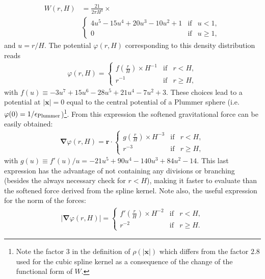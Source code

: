 \begin{align}
W(r,H) &= \frac{21}{2\pi H^3} \times \nonumber \\
&\left\lbrace\begin{array}{rcl}
4u^5 - 15u^4 + 20u^3 - 10u^2 + 1 & \mbox{if} & u < 1,\\
0 & \mbox{if} & u \geq 1,
\end{array}
\right.
\end{align}
and $u = r/H$. The potential $\varphi(r,H)$ corresponding to this density distribution reads
\begin{align}
\varphi(r,H) = 
\left\lbrace\begin{array}{rcl}
f(\frac{r}{H}) \times H^{-1} & \mbox{if} & r < H,\\
r^{-1} & \mbox{if} & r \geq H,
\end{array}
\right.
\label{eq:fmm:potential}
\end{align}
with $f(u) \equiv -3u^7 + 15u^6 - 28u^5 + 21u^4 - 7u^2 + 3$. These
choices lead to a potential at $|\mathbf{x}| = 0$ equal to the central
potential of a Plummer sphere (i.e. $\varphi(0) = 1/\epsilon_{\rm
  Plummer}$)\footnote{Note the factor $3$ in the definition of
  $\rho(|\mathbf{x}|)$ which differs from the factor $2.8$ used for
  the cubic spline kernel as a consequence of the change of the functional
  form of $W$.}. From this expression the softened gravitational force can
be easily obtained:
\begin{align}
\mathbf{\nabla}\varphi(r,H) = \mathbf{r} \cdot
\left\lbrace\begin{array}{rcl}
g(\frac{r}{H}) \times H^{-3} & \mbox{if} & r < H,\\
r^{-3} & \mbox{if} & r \geq H,
\end{array}
\right.
\label{eq:fmm:force}
\end{align}
with $g(u) \equiv f'(u)/u = -21u^5+90u^4-140u^3+84u^2-14$. This last
expression has the advantage of not containing any divisions or
branching (besides the always necessary check for $r<H$), making it
faster to evaluate than the softened force derived from the
\cite{Monaghan1985} spline kernel. Note also, the useful expression
for the norm of the forces:
\begin{align}
|\mathbf{\nabla}\varphi(r,H)| = 
\left\lbrace\begin{array}{rcl}
f'(\frac{r}{H}) \times H^{-2} & \mbox{if} & r < H,\\
r^{-2} & \mbox{if} & r \geq H.
\end{array}
\right.
\label{eq:fmm:force_norm}
\end{align}
